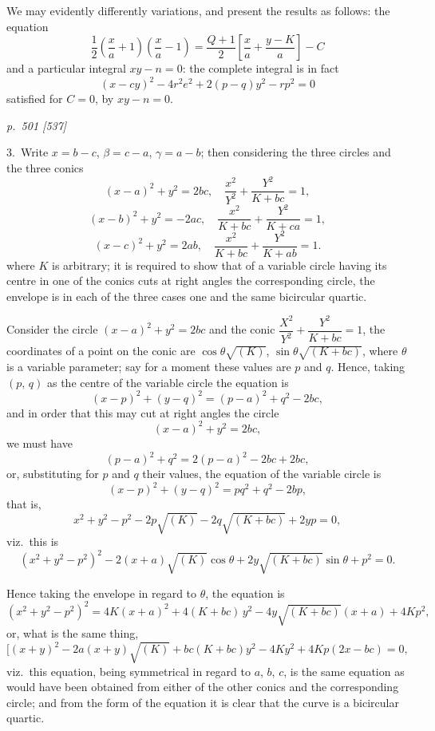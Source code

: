 \documentclass[11pt,a4paper]{book}
\begin{document}
We may evidently differently variations, and present the results as follows: the equation
\[
\frac{1}{2}\left(\frac{x}{a} + 1\right)\left(\frac{x}{a} - 1\right) = \frac{Q + 1}{2}\left[\frac{x}{a} + \frac{y - K}{a}\right] - C
\]
and a particular integral $xy - n = 0$: the complete integral is in fact
\[
(x - cy)^2 - 4r^2 e^2 + 2(p - q)y^2 - rp^2 = 0
\]
satisfied for $C = 0$, by $xy - n = 0$.

\clearpage

\bigskip
\textit{p.~501 [537]}
\smallskip

\noindent
\textsc{3.}\, Write $x = b - c$, $\beta = c - a$, $\gamma = a - b$; then considering the three circles and the
three conics
\[
(x - a)^2 + y^2 = 2bc,\quad \frac{x^2}{Y^2} + \frac{Y^2}{K + bc} = 1,
\]
\[
(x - b)^2 + y^2 = -2ac,\quad \frac{x^2}{K + bc} + \frac{Y^2}{K + ca} = 1,
\]
\[
(x - c)^2 + y^2 = 2ab,\quad \frac{x^2}{K + bc} + \frac{Y^2}{K + ab} = 1.
\]
where $K$ is arbitrary; it is required to show that of a variable circle having its centre
in one of the conics cuts at right angles the corresponding circle, the envelope is in each
of the three cases one and the same bicircular quartic.

Consider the circle $(x - a)^2 + y^2 = 2bc$ and the conic $\dfrac{X^2}{Y^2} + \dfrac{Y^2}{K + bc} = 1$, the coordinates
of a point on the conic are $\cos\theta\sqrt{(K)}$, $\sin\theta\sqrt{(K + bc)}$, where $\theta$ is a variable parameter;
say for a moment these values are $p$ and $q$. Hence, taking $(p,\,q)$ as the centre of the variable circle the equation is
\[
(x - p)^2 + (y - q)^2 = (p - a)^2 + q^2 - 2bc,
\]
and in order that this may cut at right angles the circle
\[
(x - a)^2 + y^2 = 2bc,
\]
we must have
\[
(p - a)^2 + q^2 = 2(p - a)^2 - 2bc + 2bc,
\]
or, substituting for $p$ and $q$ their values, the equation of the variable circle is
\[
(x - p)^2 + (y - q)^2 = pq^2 + q^2 - 2bp,
\]
that is,
\[
x^2 + y^2 - p^2 - 2p\sqrt{(K)} - 2q\sqrt{(K + bc)} + 2yp = 0,
\]
viz.\ this is
\[
(x^2 + y^2 - p^2)^2 - 2(x + a)\sqrt{(K)}\cos\theta + 2y\sqrt{(K + bc)}\sin\theta + p^2 = 0.
\]

Hence taking the envelope in regard to $\theta$, the equation is
\[
(x^2 + y^2 - p^2)^2 = 4K(x + a)^2 + 4(K + bc)\,y^2 - 4y\sqrt{(K + bc)}(x + a) + 4Kp^2,
\]
or, what is the same thing,
\[
[(x + y)^2 - 2a(x + y)\sqrt{(K)} + bc(K + bc)y^2 - 4Ky^2 + 4Kp(2x - bc) = 0,
\]
viz.\ this equation, being symmetrical in regard to $a$, $b$, $c$, is the same equation as would
have been obtained from either of the other conics and the corresponding circle; and
from the form of the equation it is clear that the curve is a bicircular quartic.
\end{document}
